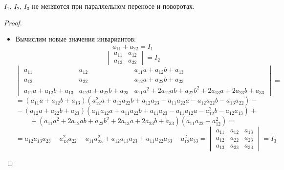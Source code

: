 \begin{theorem}
$I_1$, $I_2$, $I_3$ не меняются при параллельном переносе и поворотах.
\end{theorem}
\begin{proof}
\begin{itemize}
	\item Вычислим новые значения инвариантов:
	\begin{equation*}
	a_{11} + a_{22} = I_1
	\end{equation*}
	\begin{equation*}
	\begin{vmatrix}
	a_{11} & a_{12} \\
	a_{12} & a_{22}
	\end{vmatrix} = I_2
	\end{equation*}
	\begin{equation*}
	\begin{vmatrix}
	a_{11} & a_{12} & a_{11} a + a_{12} b + a_{13} \\
	a_{12} & a_{22} & a_{12} a + a_{22} b + a_{23} \\
	a_{11} a + a_{12} b + a_{13} & a_{12} a + a_{22} b + a_{23} & a_{11} a^2 + 2 a_{12} ab + a_{22} b^2 + 2 a_{13} a + 2 a_{23} b + a_{33}
	\end{vmatrix} =
	\end{equation*}
	\begin{equation*}
	= (a_{11} a + a_{12} b + a_{13}) (a_{12}^2 a + a_{12} a_{22} b + a_{12} a_{23} - a_{11} a_{22} a - a_{12} a_{22} b - a_{13} a_{22}) - {}
	\end{equation*}
	\begin{equation*}
	{} - (a_{12} a + a_{22} b + a_{23}) (a_{11} a_{12} a + a_{11} a_{22} b + a_{11} a_{23} - a_{11} a_{12} a - a_{12}^2 b - a_{12} a_{13}) + {}
	\end{equation*}
	\begin{equation*}
	{} + (a_{11} a^2 + 2 a_{12} ab + a_{22} b^2 + 2 a_{13} a + 2 a_{23} b + a_{33}) (a_{11} a_{22} - a_{12}^2) =
	\end{equation*}
	\begin{equation*}
	= a_{12} a_{13} a_{23} - a_{13}^2 a_{22} - a_{11} a_{23}^2 + a_{12} a_{13} a_{23} + a_{11} a_{22} a_{33} - a_{12}^2 a_{33} =
	\begin{vmatrix}
	a_{11} & a_{12} & a_{13} \\
	a_{12} & a_{22} & a_{23} \\
	a_{13} & a_{23} & a_{33}
	\end{vmatrix} = I_3
	\end{equation*}
	

\end{itemize}
\end{proof}

